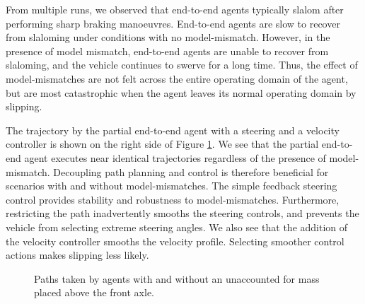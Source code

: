From multiple runs, we observed that end-to-end agents typically slalom after performing sharp braking manoeuvres.
End-to-end agents are slow to recover from slaloming under conditions with no model-mismatch.
However, in the presence of model mismatch, end-to-end agents are unable to recover from slaloming, and the vehicle continues to swerve for a long time.
Thus, the effect of model-mismatches are not felt across the entire operating domain of the agent, but are most catastrophic when the agent leaves its normal operating domain by slipping.

The trajectory by the partial end-to-end agent with a steering and a velocity controller is shown on the right side of Figure \ref{fig:unknown_mass_trajs_2}.
We see that the partial end-to-end agent executes near identical trajectories regardless of the presence of model-mismatch.
Decoupling path planning and control is therefore beneficial for scenarios with and without model-mismatches.
The simple feedback steering control provides stability and robustness to model-mismatches.
Furthermore, restricting the path inadvertently smooths the steering controls, and prevents the vehicle from selecting extreme steering angles.
We also see that the addition of the velocity controller smooths the velocity profile.
Selecting smoother control actions makes slipping less likely.


\begin{figure}[htb!]
    \centering
    
    \caption[Paths taken by agents with and without an accounted for mass placed above the front axle]{Paths taken by agents with and without an unaccounted for mass placed above the front axle.}
    \label{fig:unknown_mass_trajs_2}
\end{figure}



